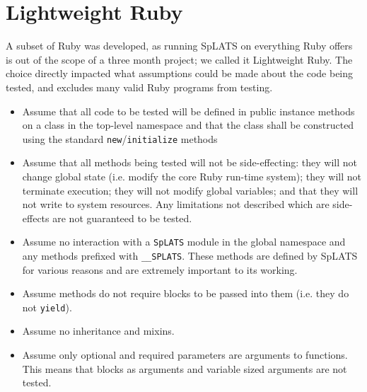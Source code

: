 \section{Lightweight Ruby}
A subset of Ruby was developed, as running SpLATS on everything Ruby offers is out of the scope of a three month project; we called it Lightweight Ruby. The choice directly impacted what assumptions could be made about the code being tested, and excludes many valid Ruby programs from testing.
\begin{itemize}
\item Assume that all code to be tested will be defined in public instance
methods on a class in the top-level namespace and that the class shall be
constructed using the standard \texttt{new}/\texttt{initialize} methods
\item Assume that all methods being tested will not be side-effecting: they will not change global state (i.e. modify the core Ruby run-time system); they will not terminate execution; they will not modify global variables; and that they will not write to system resources. Any limitations not described which are side-effects are not guaranteed to be tested.
\item Assume no interaction with a \texttt{SpLATS} module in the global namespace
and any methods prefixed with \texttt{\_\_SPLATS}. These methods are defined by SpLATS for various reasons and are extremely important to its working.
\item Assume methods do not require blocks to be passed into them (i.e. they do not
\texttt{yield}).
\item Assume no inheritance and mixins.
\item Assume only optional and required parameters are arguments to functions. This means that blocks as arguments and variable sized arguments are not tested.
\end{itemize}
